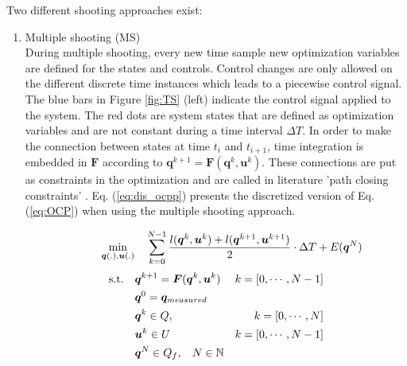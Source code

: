 Two different shooting approaches exist:\\
\begin{enumerate}
	\item Multiple shooting (MS)\\
	During multiple shooting, every new time sample new optimization variables are defined for the states and controls.
	Control changes are only allowed on the different discrete time instances which leads to a piecewise control signal. The blue bars in Figure \ref{fig:TS} (left) indicate the control signal applied to the system.  The red dots are system states that are defined as optimization variables and are not constant during a time interval $\Delta T$. In order to make the connection between states at time $t_i$ and $t_{i+1}$, time integration is embedded in $\bm{F}$ according to $\bm{q}^{k+1} = \bm{F}(\bm{q}^k, \bm{u}^k)$. These connections are put as constraints in the optimization and are called in literature 'path closing constraints' \cite{Gillis2019}. Eq. (\ref{eq:dis_ocpp}) presents the discretized version of Eq. (\ref{eq:OCP}) when using the multiple shooting approach. 

	\begin{equation*}
	\label{eq:OCP_dis}
	\begin{aligned}
	\hspace{10mm}\min_{\bm{q}(.),\bm{u}(.)} \quad & \sum_{k = 0}^{N-1}\frac{l(\bm{q}^{k},\bm{u}^{k})+l(\bm{q}^{k+1},\bm{u}^{k+1})}{2}\cdot \Delta T + E(\bm{q}^{N}) \\
	\end{aligned}
	\end{equation*}
	\begin{equation}\label{eq:dis_ocpp}
	\begin{aligned}
	\textrm{s.t.} \quad & \bm{q}^{k+1} = \bm{F}(\bm{q}^{k}, \bm{u}^{k}) & k = [0,\cdots, N-1]\\
	& \bm{q}^{0}= \bm{q}_{measured} \\
	& \bm{q}^{k}\in Q,\hspace{3 mm} & k = [0,\cdots, N]\\
	& \bm{u}^{k}\in U \hspace{3 mm} & k = [0,\cdots, N-1]\\
	& \bm{q}^{N}\in Q_f,\hspace{3 mm} N \in \mathbb{N}
	\end{aligned}
	\end{equation}


\end{enumerate}
